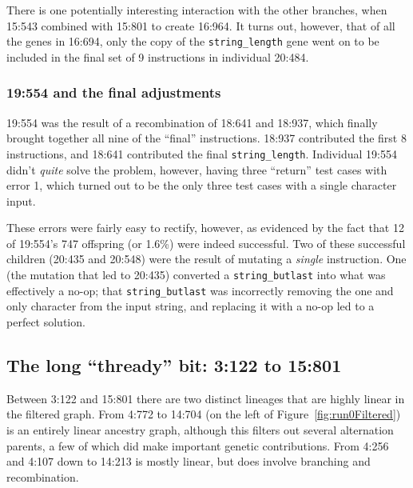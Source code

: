 There is one potentially interesting interaction with the other branches, 
when 15:543 combined with 15:801 to create 16:964. It turns out, however,
that of all the genes in 16:694, only the copy of the \texttt{string\_length} 
gene went on to be included in the final set of 9 instructions in individual 
20:484.

\subsubsection{19:554 and the final adjustments}


19:554 was the result of a recombination of 18:641 and 18:937, which finally
brought together all nine of the ``final'' instructions. 18:937 contributed
the first 8 instructions, and 18:641 contributed the final 
\texttt{string\_length}. Individual 19:554 didn't \emph{quite} solve the
problem, however, having three ``return'' test cases with error 1, which turned
out to be the only three test cases with a single character input.

These errors were fairly easy to rectify, however, as evidenced by the 
fact that 12 of 19:554's 747 offspring (or 1.6\%) were indeed successful.
Two of these successful children (20:435 and 20:548) were the result of 
mutating a \emph{single} instruction. One (the mutation that led to 20:435) 
converted a \texttt{string\_butlast} into what was effectively a no-op; that
\texttt{string\_butlast} was incorrectly removing the one and only character
from the input string, and replacing it with a no-op led to a perfect solution.

\subsection{The long ``thready'' bit: 3:122 to 15:801}


Between 3:122 and 15:801 there are two distinct lineages that are highly
linear in the filtered graph. From 4:772 to 14:704 (on the left of
Figure~\ref{fig:run0Filtered}) is an entirely linear ancestry graph, although
this filters out several alternation parents, a few of which did make
important genetic contributions. From 4:256 and 4:107 down to 14:213 is
mostly linear, but does involve branching and recombination.

